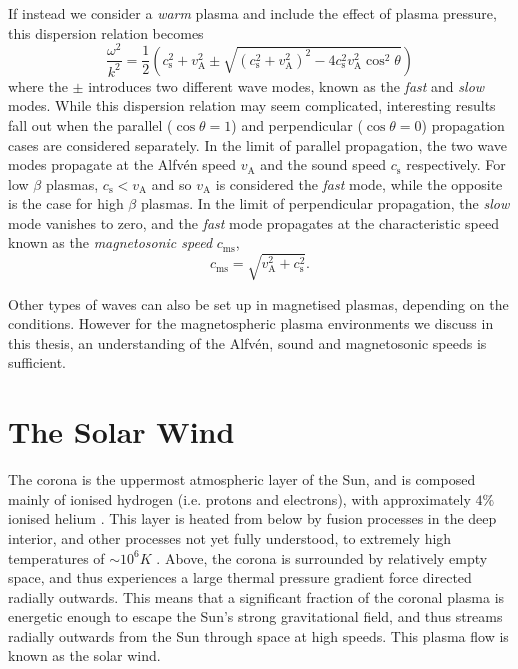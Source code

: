 If instead we consider a \textit{warm} plasma and include the effect of plasma pressure, this dispersion relation becomes
\begin{equation}
\frac{\omega^2}{k^2} = \frac{1}{2}\left(c_\mathrm{s}^2+v_\mathrm{A}^2\pm\sqrt{(c_\mathrm{s}^2+v_\mathrm{A}^2)^2-4c_\mathrm{s}^2v_\mathrm{A}^2\cos^2\theta}\right)
\end{equation}
where the $\pm$ introduces two different wave modes, known as the \textit{fast} and \textit{slow} modes. While this dispersion relation may seem complicated, interesting results fall out when the parallel ($\cos\theta = 1$) and perpendicular ($\cos\theta = 0$) propagation cases are considered separately. In the limit of parallel propagation, the two wave modes propagate at the Alfv\'en speed $v_\mathrm{A}$ and the sound speed $c_\mathrm{s}$ respectively. For low $\beta$ plasmas, $c_\mathrm{s}<v_\mathrm{A}$ and so $v_\mathrm{A}$ is considered the \textit{fast} mode, while the opposite is the case for high $\beta$ plasmas. In the limit of perpendicular propagation, the \textit{slow} mode vanishes to zero, and the \textit{fast} mode propagates at the characteristic speed known as the \textit{magnetosonic speed} $c_\mathrm{ms}$,
\begin{equation}
c_\mathrm{ms} = \sqrt{v_\mathrm{A}^2+c_\mathrm{s}^2}.
\end{equation}

Other types of waves can also be set up in magnetised plasmas, depending on the conditions. However for the magnetospheric plasma environments we discuss in this thesis, an understanding of the Alfv\'en, sound and magnetosonic speeds is sufficient.

\section{The Solar Wind} \label{intro:sec:solarwind}
The corona is the uppermost atmospheric layer of the Sun, and is composed mainly of ionised hydrogen (i.e. protons and electrons), with approximately $4\%$ ionised helium \citep{robbins1970}. This layer is heated from below by fusion processes in the deep interior, and other processes not yet fully understood, to extremely high temperatures of ${\sim}10^6\si{K}$ \citep{warren2009}. Above, the corona is surrounded by relatively empty space, and thus experiences a large thermal pressure gradient force directed radially outwards. This means that a significant fraction of the coronal plasma is energetic enough to escape the Sun's strong gravitational field, and thus streams radially outwards from the Sun through space at high speeds. This plasma flow is known as the solar wind.

